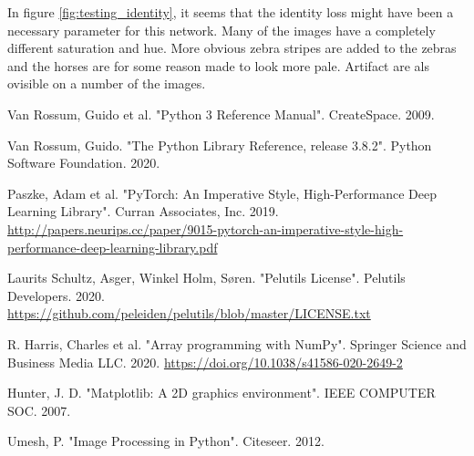 \documentclass[12pt, fleqn, titlepage]{article}
\newcommand{\1}[1]{\mathds{1}\left[#1\right]}
\begin{document}
In figure \ref{fig:testing_identity}, it seems that the identity loss might have been a necessary parameter for this network. Many of the images have a completely different saturation and hue. More obvious zebra stripes are added to the zebras and the horses are for some reason made to look more pale. Artifact are als ovisible on a number of the images.


\newpage
\begin{thebibliography}{9} 
	
	
	
		
		 Van Rossum, Guido et al. "Python 3 Reference Manual". CreateSpace. 2009.
		
		 Van Rossum, Guido. "The Python Library Reference, release 3.8.2". Python Software Foundation. 2020.
		
		 Paszke, Adam et al. "PyTorch: An Imperative Style, High-Performance Deep Learning Library". Curran Associates, Inc. 2019. \url{http://papers.neurips.cc/paper/9015-pytorch-an-imperative-style-high-performance-deep-learning-library.pdf}
		
		 Laurits Schultz, Asger, Winkel Holm, Søren. "Pelutils License". Pelutils Developers. 2020. \url{https://github.com/peleiden/pelutils/blob/master/LICENSE.txt}
		
		 R. Harris, Charles et al. "Array programming with NumPy". Springer Science and Business Media LLC. 2020. \url{https://doi.org/10.1038/s41586-020-2649-2}
		
		 Hunter, J. D. "Matplotlib: A 2D graphics environment". IEEE COMPUTER SOC. 2007.
		
		 Umesh, P. "Image Processing in Python". Citeseer. 2012.
		

\end{thebibliography}
\end{document}
